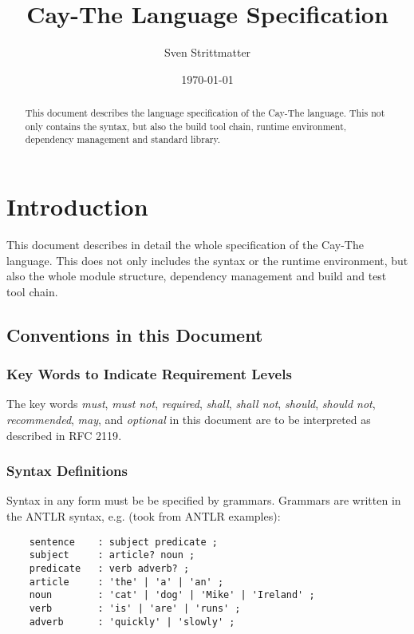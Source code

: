\documentclass[a4paper,12pt]{report}
\title{Cay-The Language Specification}
\author{Sven Strittmatter}
\date{\today}
\begin{document}
\maketitle
\begin{abstract}
    This document describes the language specification of the Cay-The language. This not only contains the syntax, but also the build tool chain, runtime environment, dependency management and standard library.
\end{abstract}
\clearpage

\tableofcontents
\clearpage

\chapter{Introduction}

This document describes in detail the whole specification of the Cay-The language. This does not only includes the syntax or the runtime environment, but also the whole module structure, dependency management and build and test tool chain.

\section{Conventions in this Document}

\subsection{Key Words to Indicate Requirement Levels}

The key words \textit{must}, \textit{must not}, \textit{required}, \textit{shall}, \textit{shall not}, \textit{should}, \textit{should not}, \textit{recommended}, \textit{may}, and \textit{optional} in this document are to be interpreted as described in RFC 2119\cite{rfc2119}.

\subsection{Syntax Definitions}

Syntax in any form must be be specified by grammars. Grammars are written in the ANTLR syntax\cite{antlr-docu}, e.g. (took from ANTLR examples\cite{antlr-grammars}):

\begin{lstlisting}
    sentence    : subject predicate ;
    subject     : article? noun ;
    predicate   : verb adverb? ;
    article     : 'the' | 'a' | 'an' ;
    noun        : 'cat' | 'dog' | 'Mike' | 'Ireland' ;
    verb        : 'is' | 'are' | 'runs' ;
    adverb      : 'quickly' | 'slowly' ;
\end{lstlisting}
\end{document}
